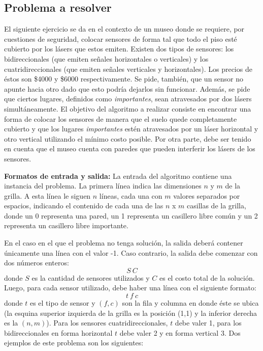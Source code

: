 \subsection{Problema a resolver}

El siguiente ejercicio se da en el contexto de un museo donde se requiere, por cuestiones de seguridad, colocar sensores de forma tal que todo el piso esté cubierto por los lásers que estos emiten. Existen dos tipos de sensores: los bidireccionales (que emiten señales horizontales o verticales) y los cuatridireccionales (que emiten señales verticales y horizontales). Los precios de éstos son \$4000 y \$6000 respectivamente. Se pide, también, que un sensor no apunte hacia otro dado que esto podría dejarlos sin funcionar. Además, se pide que ciertos lugares, definidos como \textit{importantes}, sean atravesados por dos lásers simultáneamente. El objetivo del algoritmo a realizar consiste en encontrar una forma de colocar los sensores de manera que el suelo quede completamente cubierto y que los lugares \textit{importantes} estén atravesados por un láser horizontal y otro vertical utilizando el mínimo costo posible. Por otra parte, debe ser tenido en cuenta que el museo cuenta con paredes que pueden interferir los lásers de los sensores.\newline

\newline
\textbf {Formatos de entrada y salida:}\newline
\newline
La entrada del algoritmo contiene una instancia del problema. La primera línea indica las dimensiones $n$ y $m$ de la grilla. A esta línea le siguen $n$ líneas, cada una con $m$ valores separados por espacios, indicando el contenido de cada una de las $n$ x $m$ casillas de la grilla, donde un 0 representa una pared, un 1 representa un casillero libre común y un 2 representa un casillero libre importante.\newline

En el caso en el que el problema no tenga solución, la salida deberá contener únicamente una línea con el valor -1. Caso contrario, la salida debe comenzar con dos números enteros: 
$$S\ C$$ 
donde $S$ es la cantidad de sensores utilizados y $C$ es el costo total de la solución. Luego, para cada sensor utilizado, debe haber una línea con el siguiente formato: 
$$t\ f\ c$$ 
donde $t$ es el tipo de sensor y $(f,c)$ son la fila y columna en donde éste se ubica (la esquina superior izquierda de la grilla es la posición (1,1) y la inferior derecha es la $(n,m)$). Para los sensores cuatridireccionales, $t$ debe valer 1, para los bidireccionales en forma horizontal $t$ debe valer 2 y en forma vertical 3.\newline
\newline
Dos ejemplos de este problema son los siguientes:


